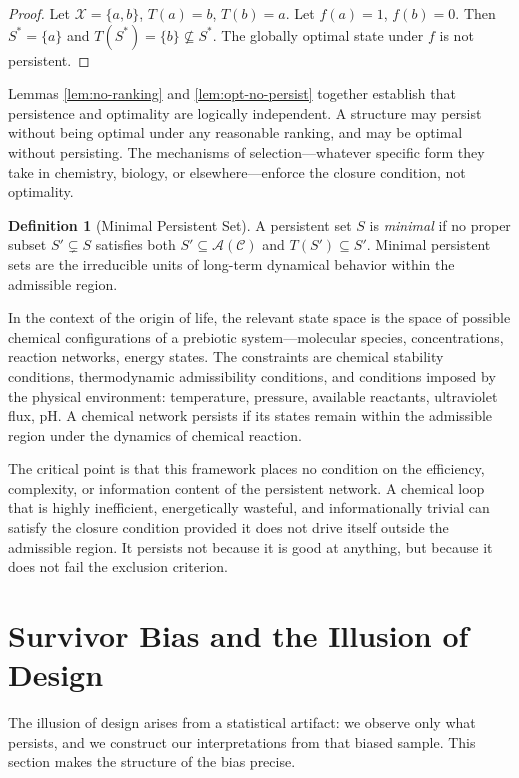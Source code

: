 \documentclass[12pt, a4paper, oneside]{article}
\theoremstyle{plain}
\theoremstyle{definition}
\newtheorem{definition}[theorem]{Definition}
\theoremstyle{remark}
\newcommand{\X}{\mathcal{X}}
\newcommand{\C}{\mathcal{C}}
\newcommand{\A}{\mathcal{A}}
\newcommand{\T}{T}
\begin{document}
\begin{proof}
Let $\X = \{a, b\}$, $\T(a) = b$, $\T(b) = a$. Let $f(a) = 1$, $f(b) = 0$. Then $S^* = \{a\}$ and $\T(S^*) = \{b\} \not\subseteq S^*$. The globally optimal state under $f$ is not persistent.
\end{proof}

Lemmas \ref{lem:no-ranking} and \ref{lem:opt-no-persist} together establish that persistence and optimality are logically independent. A structure may persist without being optimal under any reasonable ranking, and may be optimal without persisting. The mechanisms of selection---whatever specific form they take in chemistry, biology, or elsewhere---enforce the closure condition, not optimality.

\begin{definition}[Minimal Persistent Set]
A persistent set $S$ is \emph{minimal} if no proper subset $S' \subsetneq S$ satisfies both $S' \subseteq \A(\C)$ and $\T(S') \subseteq S'$. Minimal persistent sets are the irreducible units of long-term dynamical behavior within the admissible region.
\end{definition}

In the context of the origin of life, the relevant state space is the space of possible chemical configurations of a prebiotic system---molecular species, concentrations, reaction networks, energy states. The constraints are chemical stability conditions, thermodynamic admissibility conditions, and conditions imposed by the physical environment: temperature, pressure, available reactants, ultraviolet flux, pH. A chemical network persists if its states remain within the admissible region under the dynamics of chemical reaction.

The critical point is that this framework places no condition on the efficiency, complexity, or information content of the persistent network. A chemical loop that is highly inefficient, energetically wasteful, and informationally trivial can satisfy the closure condition provided it does not drive itself outside the admissible region. It persists not because it is good at anything, but because it does not fail the exclusion criterion.

\section{Survivor Bias and the Illusion of Design}

The illusion of design arises from a statistical artifact: we observe only what persists, and we construct our interpretations from that biased sample. This section makes the structure of the bias precise.
\end{document}
